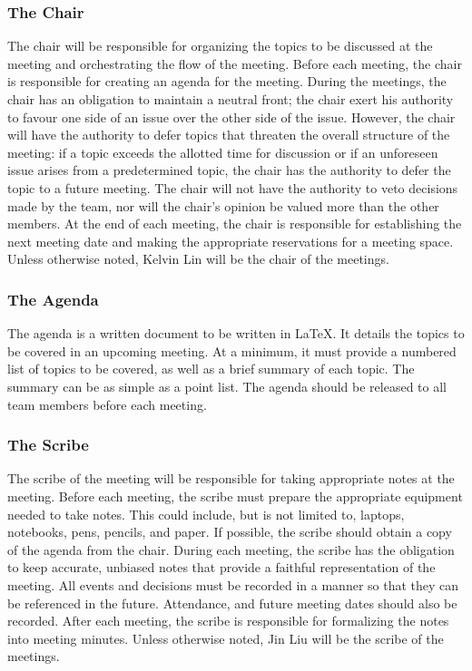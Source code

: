 \documentclass{article}
\begin{document}
\subsubsection{The Chair}
The chair will be responsible for organizing the topics to be discussed at the 
meeting and orchestrating the flow of the meeting. Before each meeting, the 
chair is responsible for creating an agenda for the meeting. During the 
meetings, the chair has an obligation to maintain a neutral front; the chair 
exert his authority to favour one side of an issue over the other side of the 
issue. However, the chair will have the authority to defer topics that threaten 
the overall structure of the meeting: if a topic exceeds the allotted time for 
discussion or if an unforeseen issue arises from a predetermined topic, the 
chair has the authority to defer the topic to a future meeting. The chair will 
not have the authority to veto decisions made by the team, nor will the chair's 
opinion be valued more than the other members. At the end of each meeting, the 
chair is responsible for establishing the next meeting date and making the 
appropriate reservations for a meeting space. Unless otherwise noted, Kelvin Lin 
will be the chair of the meetings.

\subsubsection{The Agenda}
The agenda is a written document to be written in \LaTeX. It details the topics 
to be covered in an upcoming meeting. At a minimum, it must provide a numbered 
list of topics to be covered, as well as a brief summary of each topic. The 
summary can be as simple as a point list. The agenda should be released to all team members 
before each meeting.

\subsubsection{The Scribe}
The scribe of the meeting will be responsible for taking appropriate notes at 
the meeting. Before each meeting, the scribe must prepare the appropriate 
equipment needed to take notes. This could include, but is not limited to, 
laptops, notebooks, pens, pencils, and paper. If possible, the scribe should 
obtain a copy of the agenda from the chair. During each meeting, the scribe has 
the obligation to keep accurate, unbiased notes that provide a faithful 
representation of the meeting. All events and decisions must be recorded in a 
manner so that they can be referenced in the future. Attendance, and future 
meeting dates should also be recorded. After each meeting, the scribe is 
responsible for formalizing the notes into meeting minutes. Unless otherwise 
noted, Jin Liu will be the scribe of the meetings.
\end{document}
